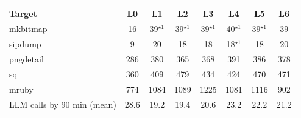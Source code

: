 \begin{tabular}{lccccccc}
\toprule
Target & L0 & L1 & L2 & L3 & L4 & L5 & L6 \\
\midrule
mkbitmap & 16 & 39$^{\star1}$ & 39$^{\star1}$ & 39$^{\star1}$ & 40$^{\star1}$ & 39$^{\star1}$ & 39 \\
sipdump & 9 & 20 & 18 & 18 & 18$^{\star1}$ & 18 & 20 \\
pngdetail & 286 & 380 & 365 & 368 & 391 & 386 & 378 \\
sq & 360 & 409 & 479 & 434 & 424 & 470 & 471 \\
mruby & 774 & 1084 & 1089 & 1225 & 1081 & 1116 & 902 \\
\midrule
LLM calls by 90 min (mean) & 28.6 & 19.2 & 19.4 & 20.6 & 23.2 & 22.2 & 21.2 \\
\bottomrule
\end{tabular}
